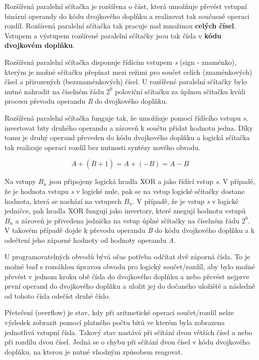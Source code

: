 
Rozšířená paralelní sčítačka je rozšířena o část, která umožňuje převést vstupní binární operandy do kódu dvojkového doplňku a realizovat tak současně operaci rozdíl. Rozšírená paralelní sčítačka tak pracuje nad množinou {\bf celých čísel}. Vstupem a výstupem rozšírené paralelní sčítačky jsou tak čísla v {\bf kódu dvojkovém doplňku}.


Rozšířená paralelní sčítačka disponuje řídícím vstupem {\it s} (sign - znaménko), kterým je možné sčítačku přepínat mezi režimi pro součet celích (znaménkových) čísel a přirozených (bezznaménkových) čísel. U rozšířené paralelní sčítačky bylo nutné nahradit na číselném řádu $2^0$ poloviční sčítačku za úplnou sčítačku kvůli procesu převodu operandu {\it B} do dvojkového doplňku.

Rozšířená paralelní sčítačka funguje tak, že umožňuje pomocí řídícího vstupu {\it s}, invertovat bity druhého operandu a zároveň k součtu přidat hodnotu jedna. Díky tomu je druhý operand převeden do kódu dvojkového doplňku a logická sčítačka tak realizuje operaci rozdíl bez nutnosti syntézy nového obvodu.

$$ A + (\overline{B}+1)  = A + (-B) = A - B  $$  

Na vstupy $B_n$ jsou připojeny logická hradla XOR a jako řídící vstup {\it s}. V případě, že je hodnota vstupu {\it s} v logické nule, pak se na vstup logické sčítačky dostane hodnota, která se nachází na vstupech $B_n$. V případě, že je vstup {\it s} v logické jedničce, pak hradla XOR fungují jako invertory, které znegují hodnotu vstupů $B_n$ a zároveň je přivedena jednička na vstup úplné sčítačky na číselném řádu $2^0$. V takovém případě dojde k převodu operandu {\it B} do kódu dvojkového doplňku a k odečtení jeho záporné hodnoty od hodnoty operandu {\it A}.


\vskip 4mm
\centerline{}
\vskip 4mm

U programovatelných obvodů bývá očas potřeba odčítat dvě záporná čísla. To je možné buď s rozsáhlou úpravou obvodu pro logický součet/rozdíl, aby bylo možné převést v jednom kroku obě čísla do dvojkového doplňku a nebo převést nejprve první operand do dvojkového doplňku a uložit jej do dočaného uložiště a následně od tohoto čísla odečíst druhé číslo.



Přetečení (overflow) je stav, kdy při aritmetické operaci součet/rozdíl nelze výsledek zobrazit pomocí platného počtu bitů ve kterém byla zobrazena jednotlivá vstupní čísla. Takový stav nastává při sčítání dvou větších čísel a nebo při rozdílu dvou čísel. Jedná se o chybu při sčítání dvou čísel v kódu dvojkového doplňku, na kterou je nutné vhodným způsobem reagovat. 

